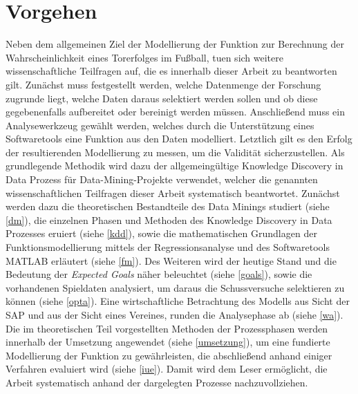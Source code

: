 \section{Vorgehen}

Neben dem allgemeinen Ziel der Modellierung der Funktion zur Berechnung der Wahrscheinlichkeit eines Torerfolges im Fußball, tuen sich weitere wissenschaftliche Teilfragen auf, die es innerhalb dieser Arbeit zu beantworten gilt. Zunächst muss festgestellt werden, welche Datenmenge der Forschung zugrunde liegt, welche Daten daraus selektiert werden sollen und ob diese gegebenenfalls aufbereitet oder bereinigt werden müssen. Anschließend muss ein Analysewerkzeug gewählt werden, welches durch die Unterstützung eines Softwaretools eine Funktion aus den Daten modelliert. Letztlich gilt es den Erfolg der resultierenden Modellierung zu messen, um die Validität sicherzustellen. Als grundlegende Methodik wird dazu der allgemeingültige Knowledge Discovery in Data Prozess für Data-Mining-Projekte verwendet, welcher die genannten wissenschaftlichen Teilfragen dieser Arbeit systematisch beantwortet. Zunächst werden dazu die theoretischen Bestandteile des Data Minings studiert (siehe \vref{dm}), die einzelnen Phasen und Methoden des Knowledge Discovery in Data Prozesses eruiert (siehe \vref{kdd}), sowie die mathematischen Grundlagen der Funktionsmodellierung mittels der Regressionsanalyse und des Softwaretools MATLAB erläutert (siehe \vref{fm}). Des Weiteren wird der heutige Stand und die Bedeutung der \textit{Expected Goals} näher beleuchtet (siehe \vref{goals}), sowie die vorhandenen Spieldaten analysiert, um daraus die Schussversuche selektieren zu können (siehe \vref{opta}). Eine wirtschaftliche Betrachtung des Modells aus Sicht der SAP und aus der Sicht eines Vereines, runden die Analysephase ab (siehe \vref{wa}). Die im theoretischen Teil vorgestellten Methoden der Prozessphasen werden innerhalb der Umsetzung angewendet (siehe \vref{umsetzung}), um eine fundierte Modellierung der Funktion zu gewährleisten, die abschließend anhand einiger Verfahren evaluiert wird (siehe \vref{iue}). Damit wird dem Leser ermöglicht, die Arbeit systematisch anhand der dargelegten Prozesse nachzuvollziehen.

